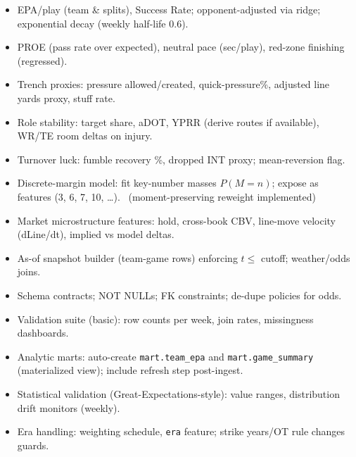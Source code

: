 \begin{itemize}
  \item {} EPA/play (team \& splits), Success Rate; opponent-adjusted via ridge; exponential decay (weekly half-life 0.6).
  \item {} PROE (pass rate over expected), neutral pace (sec/play), red-zone finishing (regressed).
  \item {} Trench proxies: pressure allowed/created, quick-pressure\%, adjusted line yards proxy, stuff rate.
  \item {} Role stability: target share, aDOT, YPRR (derive routes if available), WR/TE room deltas on injury.
  \item {} Turnover luck: fumble recovery \%, dropped INT proxy; mean-reversion flag.
  \item {} Discrete-margin model: fit key-number masses $P(M=n)$; expose as features (3, 6, 7, 10, \dots). \wip\ (moment-preserving reweight implemented)
  \item {} Market microstructure features: hold, cross-book CBV, line-move velocity (dLine/dt), implied vs model deltas.
  \item {} As-of snapshot builder (team-game rows) enforcing $t\le$ cutoff; weather/odds joins. \done
\end{itemize}

\begin{itemize}
  \item {} Schema contracts; NOT NULLs; FK constraints; de-dupe policies for odds.
  \item {} Validation suite (basic): row counts per week, join rates, missingness dashboards.
  \item {} Analytic marts: auto-create \texttt{mart.team\_epa} and \texttt{mart.game\_summary} (materialized view); include refresh step post-ingest. \done
  \item {} Statistical validation (Great-Expectations-style): value ranges, distribution drift monitors (weekly).
  \item {} Era handling: weighting schedule, \texttt{era} feature; strike years/OT rule changes guards.
\end{itemize}

